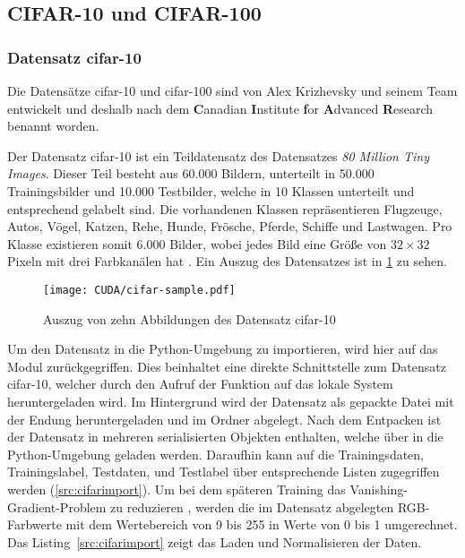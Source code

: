 %
%


\subsection{CIFAR-10 und CIFAR-100}





\subsubsection{Datensatz \ac{cifar}-10}\label{sec:dataset}

Die Datensätze \ac{cifar}-10 und \ac{cifar}-100 sind von Alex Krizhevsky und seinem Team entwickelt   und deshalb nach dem \textbf{C}anadian \textbf{I}nstitute \textbf{f}or \textbf{A}dvanced \textbf{R}esearch benannt worden.  



Der Datensatz \ac{cifar}-10 ist ein Teildatensatz des  Datensatzes \emph{80 Million Tiny Images}. Dieser Teil besteht aus 60.000 Bildern, unterteilt in 50.000 Trainingsbilder und 10.000 Testbilder, welche in 10 Klassen unterteilt und entsprechend gelabelt sind. Die vorhandenen Klassen repräsentieren Flugzeuge, Autos, Vögel, Katzen, Rehe, Hunde, Frösche, Pferde, Schiffe und Lastwagen. Pro Klasse existieren somit 6.000 Bilder, wobei jedes Bild eine Größe von $32\times32$ Pixeln mit drei Farbkanälen hat \cite{Krizhevsky:2009,Krizhevsky:2017}. Ein Auszug des Datensatzes ist in \cref{fig:cifar-example} zu sehen.

\begin{figure}[htb]
	\centering
	\texttt{[image: CUDA/cifar-sample.pdf]}
	\caption{Auszug von zehn Abbildungen des Datensatz \ac{cifar}-10}
	\label{fig:cifar-example}
\end{figure}

Um den Datensatz in die Python-Umgebung zu importieren, wird hier auf das Modul  zurückgegriffen. Dies beinhaltet eine direkte Schnittstelle zum Datensatz \ac{cifar}-10, welcher durch den Aufruf der Funktion  auf das lokale System heruntergeladen wird. Im Hintergrund wird der Datensatz als gepackte Datei mit der Endung  heruntergeladen und im Ordner  abgelegt. Nach dem Entpacken ist der Datensatz in mehreren serialisierten Objekten enthalten, welche über  in die Python-Umgebung geladen werden. Daraufhin kann auf die Trainingsdaten, Trainingslabel, Testdaten, und Testlabel über entsprechende Listen zugegriffen werden (\cref{src:cifarimport}). Um bei dem späteren Training das Vanishing-Gradient-Problem zu reduzieren \cite{Ide:2017}, werden die im Datensatz abgelegten RGB-Farbwerte mit dem Wertebereich von 9 bis 255 in Werte von 0 bis 1 umgerechnet. Das Listing~\ref{src:cifarimport} zeigt das Laden und Normalisieren der Daten.



